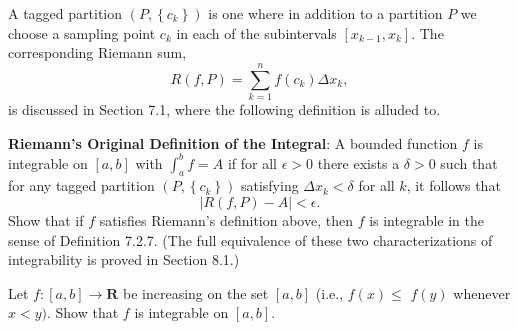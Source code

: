 \begin{exercise}
A tagged partition $\left(P,\left\{c_{k}\right\}\right)$ is one where in addition to a partition $P$ we choose a sampling point $c_{k}$ in each of the subintervals $\left[x_{k-1}, x_{k}\right]$. The corresponding Riemann sum,
$$
R(f, P)=\sum_{k=1}^{n} f\left(c_{k}\right) \Delta x_{k},
$$
is discussed in Section 7.1, where the following definition is alluded to.

{\bf Riemann's Original Definition of the Integral}: A bounded function $f$ is integrable on $[a, b]$ with $\int_{a}^{b} f=A$ if for all $\epsilon>0$ there exists a $\delta>0$ such that for any tagged partition $\left(P,\left\{c_{k}\right\}\right)$ satisfying $\Delta x_{k}<\delta$ for all $k$, it follows that
$$
|R(f, P)-A|<\epsilon .
$$
Show that if $f$ satisfies Riemann's definition above, then $f$ is integrable in the sense of Definition 7.2.7. (The full equivalence of these two characterizations of integrability is proved in Section 8.1.)
\end{exercise}
\begin{solution}
    \TODO
\end{solution}

\begin{exercise}
Let $f:[a, b] \rightarrow \mathbf{R}$ be increasing on the set $[a, b]$ (i.e., $f(x) \leq$ $f(y)$ whenever $x<y)$. Show that $f$ is integrable on $[a, b]$.
\end{exercise}
\begin{solution}
    \TODO
\end{solution}
